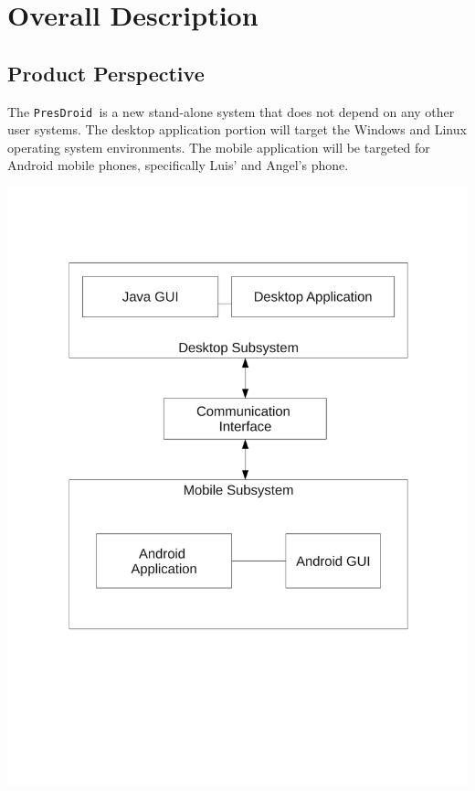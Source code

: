 \documentclass{article}
\newcommand{\pd}{\texttt{PresDroid }}
\begin{document}

\newpage
\section{Overall Description}
\subsection{Product Perspective}
The \pd is a new stand-alone system that does not depend on any other user systems.  
The desktop application portion will target the Windows and Linux operating system environments.
The mobile application will be targeted for Android mobile phones, specifically Luis' and Angel's phone.

\begin{center}
\includegraphics[trim=0cm 5cm 0cm 3cm, clip, scale=0.4]{ppd}
\end{center}
\end{document}
